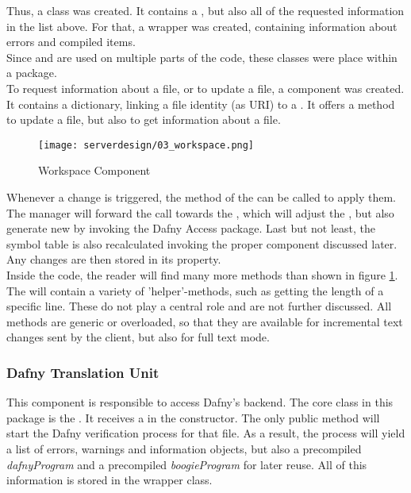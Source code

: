 Thus, a class  was created.
It contains a , but also all of the requested information in the list above.
For that, a wrapper  was created, containing information about errors and compiled items.\\

Since  and  are used on multiple parts of the code, these classes were place within a  package.\\

To request information about a file, or to update a file, a component  was created.
It contains a dictionary, linking a file identity (as URI) to a .
It offers a method to update a file, but also to get information about a file.\\

\begin{figure}[H]
    \centering
    \texttt{[image: serverdesign/03\_workspace.png]}
    \caption{Workspace Component}
    \label{fig:server_workspace}
\end{figure}

Whenever a change is triggered, the  method of the  can be called to apply them.
The manager will forward the call towards the , which will adjust the ,
but also generate new  by invoking the Dafny Access package.
Last but not least, the symbol table is also recalculated invoking the proper component discussed later.
Any changes are then stored in its  property.\\

Inside the code, the reader will find many more methods than shown in figure \ref{fig:server_workspace}.
The  will contain a variety of 'helper'-methods, such as getting the length of a specific line.
These do not play a central role and are not further discussed.
All  methods are generic or overloaded, so that they are available for incremental text changes sent by the client, but also for full text mode.


\subsubsection{Dafny Translation Unit}
This component is responsible to access Dafny's backend.
The core class in this package is the \linebreak {}.
It receives a  in the constructor.
The only public method  will start the Dafny verification process for that file.
As a result, the process will yield a list of errors, warnings and information objects, but also a precompiled \textit{dafnyProgram} and a precompiled \textit{boogieProgram} for later reuse.
All of this information is stored in the  wrapper class.\\

